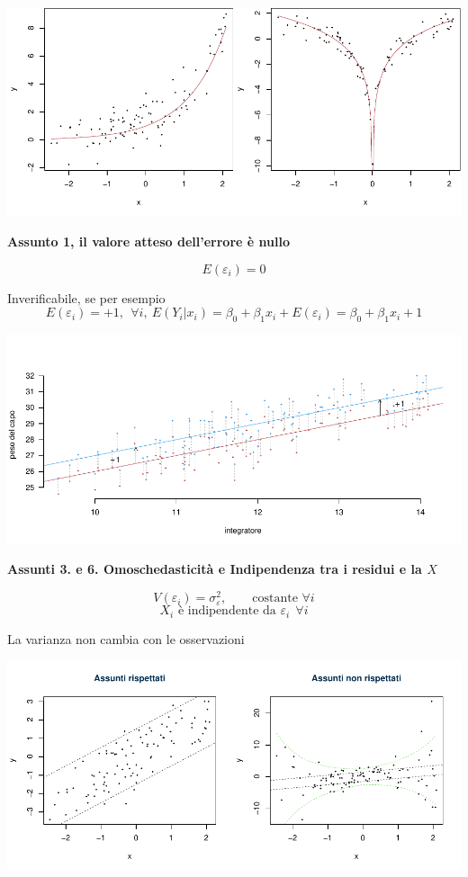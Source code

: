 \documentclass[
  11pt,
]{book}
\theoremstyle{mytheoremstyle}
\theoremstyle{mydefstyle}
\begin{document}
\begin{center}\includegraphics{Appunti_di_Statistica_2025_files/figure-latex/17-regressione-I-20-2} \end{center}

\textbf{Assunto 1, il valore atteso dell'errore è nullo}

\[E(\varepsilon_i)=0\]

Inverificabile, se per esempio
\[E(\varepsilon_i)=+1,~~\forall i,~ E(Y_i|x_i)=\beta_0+\beta_1x_i+E(\varepsilon_i)=\beta_0+\beta_1x_i+1\]

\begin{center}\includegraphics{Appunti_di_Statistica_2025_files/figure-latex/17-regressione-I-21-1} \end{center}

\textbf{Assunti 3. e 6. Omoschedasticità e Indipendenza tra i residui e la \(X\)}

\[V(\varepsilon_{i}) = \sigma_\varepsilon^2,\qquad \text{costante }\forall i\]
\[X_i\text{ è indipendente da }\varepsilon_i~~\forall i\]

La varianza non cambia con le osservazioni

\begin{center}\includegraphics{Appunti_di_Statistica_2025_files/figure-latex/17-regressione-I-23-1} \end{center}
\end{document}
